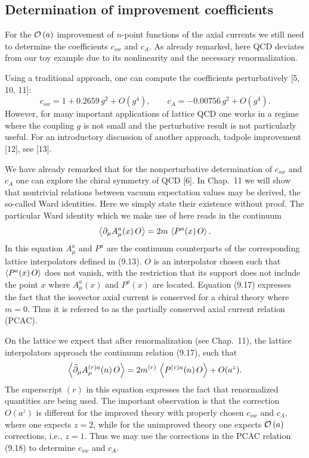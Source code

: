 \subsection{Determination of improvement coefficients}
\label{sec:9.1.4}

For the $\mathcal{O}\left(a\right)$ improvement of $n$-point functions of the axial currents
we still need to determine the coefficients $c_{sw}$ and $c_A$. As already
remarked, here QCD deviates from our toy example due to its nonlinearity and
the necessary renormalization.

Using a traditional approach, one can compute the coefficients perturbatively
[5, 10, 11]:
\begin{equation}
  c_{sw} = 1 + 0.2659\,g^2 + O(g^4) , \qquad c_A = -0.00756\,g^2 + O(g^4) .
\end{equation}
However, for many important applications of lattice QCD one works in a regime
where the coupling $g$ is not small and the perturbative result is not
particularly useful. For an introductory discussion of another approach,
tadpole improvement [12], see [13].

We have already remarked that for the nonperturbative determination of $c_{sw}$
and $c_A$ one can explore the chiral symmetry of QCD [6]. In Chap.~11 we will
show that nontrivial relations between vacuum expectation values may be
derived, the so-called Ward identities. Here we simply state their existence
without proof. The particular Ward identity which we make use of here reads in
the continuum
\begin{equation}
  \left\langle \partial_\mu A^a_\mu(x)\,O \right\rangle = 2m\,\left\langle P^a(x)\,O \right\rangle .
\end{equation}
In this equation $A^a_\mu$ and $P^a$ are the continuum counterparts of the
corresponding lattice interpolators defined in (9.13). $O$ is an interpolator
chosen such that $\left\langle P^a(x)\,O \right\rangle$ does not vanish, with the restriction that
its support does not include the point $x$ where $A^a_\mu(x)$ and $P^a(x)$ are
located. Equation (9.17) expresses the fact that the isovector axial current
is conserved for a chiral theory where $m = 0$. Thus it is referred to as the
partially conserved axial current relation (PCAC).

On the lattice we expect that after renormalization (see Chap.~11), the
lattice interpolators approach the continuum relation (9.17), such that
\begin{equation}
  \left\langle \widetilde{\partial}_\mu A^{(r)a}_\mu(n)\,O \right\rangle
  = 2m^{(r)}\,\left\langle P^{(r)a}(n)\,O \right\rangle + O(a^z) .
\end{equation}
The superscript $(r)$ in this equation expresses the fact that renormalized
quantities are being used. The important observation is that the correction
$O(a^z)$ is different for the improved theory with properly chosen $c_{sw}$ and
$c_A$, where one expects $z = 2$, while for the unimproved theory one expects
$\mathcal{O}\left(a\right)$ corrections, i.e., $z = 1$. Thus we may use the corrections in the
PCAC relation (9.18) to determine $c_{sw}$ and $c_A$.

